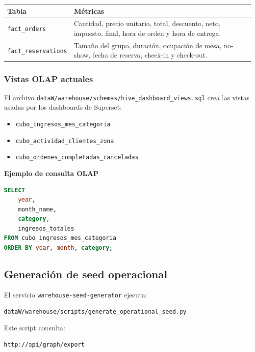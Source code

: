 \documentclass[12pt,letterpaper]{article}
\def\codefile#1{\nolinkurl{#1}}
\begin{document}
\begin{longtable}{p{}p{}}
\toprule
\textbf{Tabla} & \textbf{Métricas}\\
\midrule
\codefile{fact\_orders} & Cantidad, precio unitario, total, descuento, neto, impuesto, final, hora de orden y hora de entrega.\\
\codefile{fact\_reservations} & Tamaño del grupo, duración, ocupación de mesa, no-show, fecha de reserva, check-in y check-out.\\
\bottomrule
\end{longtable}

\subsubsection{Vistas OLAP actuales}

El archivo \codefile{dataW/warehouse/schemas/hive\_dashboard\_views.sql} crea las vistas usadas por los dashboards de Superset:

\begin{itemize}
    \item \codefile{cubo\_ingresos\_mes\_categoria}
    \item \codefile{cubo\_actividad\_clientes\_zona}
    \item \codefile{cubo\_ordenes\_completadas\_canceladas}
\end{itemize}

\textbf{Ejemplo de consulta OLAP}
\begin{lstlisting}[language=SQL]
SELECT
    year,
    month_name,
    category,
    ingresos_totales
FROM cubo_ingresos_mes_categoria
ORDER BY year, month, category;
\end{lstlisting}

\subsection{Generación de seed operacional}

El servicio \codefile{warehouse-seed-generator} ejecuta:

\begin{lstlisting}
dataW/warehouse/scripts/generate_operational_seed.py
\end{lstlisting}

Este script consulta:

\begin{lstlisting}
http://api/graph/export
\end{lstlisting}
\end{document}
